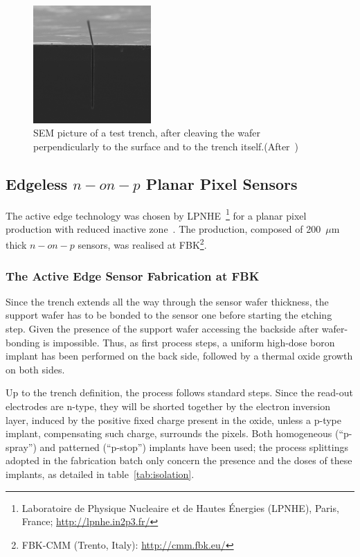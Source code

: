 \begin{figure}[!htpb]
\begin{center}
\includegraphics[width=0.40\textwidth]{trench.pdf}
\caption{\label{fig:trench}SEM picture of  a test trench, after cleaving the wafer perpendicularly to the surface and to the trench itself.(After~\cite{bib:nim2012})}
\end{center}
\end{figure}

\subsection{Edgeless $n-on-p$ Planar Pixel Sensors}
The active edge technology was chosen  by LPNHE~\footnote{Laboratoire de Physique Nucleaire et de Hautes \'Energies (LPNHE), Paris, France; \url{http://lpnhe.in2p3.fr/}} for a  planar pixel production
 with reduced inactive zone~\cite{bib:nim2012}.
The production, composed of 200~$\mu$m thick $n-on-p$ sensors, was realised at FBK\footnote{FBK-CMM (Trento, Italy): \url{http://cmm.fbk.eu/}}.

\subsubsection{The Active Edge Sensor Fabrication at FBK}
Since the trench extends all the way through the sensor wafer thickness, the support wafer has to 
be bonded to the sensor one before starting the etching step.
Given the presence of the  support wafer  accessing the backside  after wafer-bonding is impossible.
Thus, as first process steps, a uniform high-dose boron implant has been performed on the back side, 
followed by a thermal oxide growth on
both sides.

Up to the trench definition, the process follows standard steps. Since the read-out electrodes are n-type, they will be shorted together by the electron
inversion layer, induced by the positive fixed charge present in the oxide, unless a p-type implant, compensating such charge, surrounds the pixels.
Both homogeneous (``p-spray'') and patterned (``p-stop'') implants have been used;
the process splittings adopted in the fabrication batch only concern the presence and the doses of these implants,  as detailed in table~\ref{tab:isolation}.



